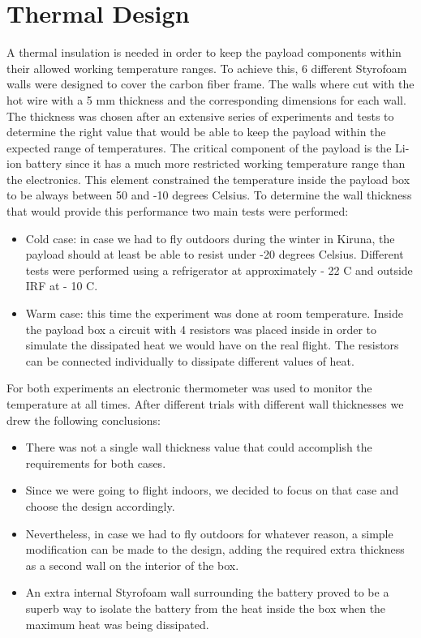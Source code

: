 \section{Thermal Design}
A thermal insulation is needed in order to keep the payload components within their allowed working temperature ranges. To achieve this, 6 different Styrofoam walls were designed to cover the carbon fiber frame. The walls where cut with the hot wire with a 5 mm thickness and the corresponding dimensions for each wall. 
The thickness was chosen after an extensive series of experiments and tests to determine the right value that would be able to keep the payload within the expected range of temperatures. The critical component of the payload is the Li-ion battery since it has a much more restricted working temperature range than the electronics. This element constrained the temperature inside the payload box to be always between 50 and -10 degrees Celsius.  To determine the wall thickness that would provide this performance two main tests were performed:

\begin{itemize}
\item Cold case: in case we had to fly outdoors during the winter in Kiruna, the payload should at least be able to resist under -20 degrees Celsius. Different tests were performed using a refrigerator at approximately - 22 C and outside IRF at - 10 C. 
\item Warm case: this time the experiment was done at room temperature. Inside the payload box a circuit with 4 resistors was placed inside in order to simulate the dissipated heat we would have on the real flight. The resistors can be connected individually to dissipate different values of heat. 
\end{itemize}

For both experiments an electronic thermometer was used to monitor the temperature at all times. After different trials with different wall thicknesses we drew the following conclusions:

\begin{itemize}
\item There was not a single wall thickness value that could accomplish the requirements for both cases. 
\item Since we were going to flight indoors, we decided to focus on that case and choose the design accordingly. 
\item Nevertheless, in case we had to fly outdoors for whatever reason, a simple modification can be made to the design, adding the required extra thickness as a second wall on the interior of the box. 
\item An extra internal Styrofoam wall surrounding the battery proved to be a superb way to isolate the battery from the heat inside the box when the maximum heat was being dissipated. 
\end{itemize}

